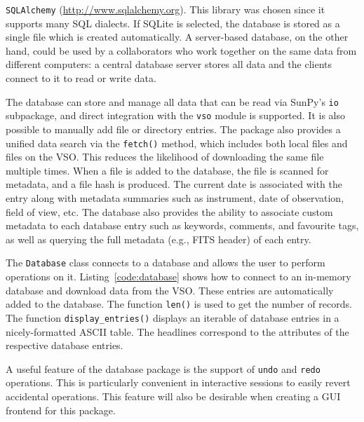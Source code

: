 {\texttt{SQLAlchemy} (\href{http://www.sqlalchemy.org}{http://www.sqlalchemy.org}). This library was chosen
since it supports many SQL dialects. 
If SQLite is selected, the database is stored as a single file which is
created automatically. A server-based database, on the other hand, could be used
by a collaborators who work together on the
same data from different computers: a central database server stores all data and the clients connect to
it to read or write data.

The database can store and manage all data that can be read via SunPy's 
\texttt{io} subpackage, and direct integration with the \texttt{vso} 
module is supported.
It is also possible to manually add file or directory entries. The package also provides
a unified data search via the \texttt{fetch()} method, which includes both local files
and files on the \textsc{VSO}. This reduces the likelihood of downloading the same file 
multiple times. When a file is added to the database, the file is scanned for metadata,
and a file hash is produced. 
The current date is associated with the entry along with metadata summaries such 
as instrument, date of observation, field of view, etc. 
The database also provides the ability to associate custom metadata to 
each database entry such as keywords, comments, and favourite tags, as well as 
querying the full metadata (e.g., FITS header) of each entry.

The \texttt{Database} class connects to a database and allows the user to 
perform operations on it. Listing~\ref{code:database} shows how to connect
to an in-memory database and download data from the \textsc{VSO}. These entries are
automatically added to the database. The function \texttt{len()} is used to get the number of
records. The function \texttt{display\_entries()} displays an iterable of 
database entries in a nicely-formatted \textsc{ASCII} table. The headlines 
correspond to the attributes of the respective database entries.

A useful feature of the database package is the support of \texttt{undo}
and \texttt{redo} operations. This is particularly convenient in
interactive sessions to easily revert accidental operations. 
This feature will also be desirable when creating a GUI frontend for this package.

}
